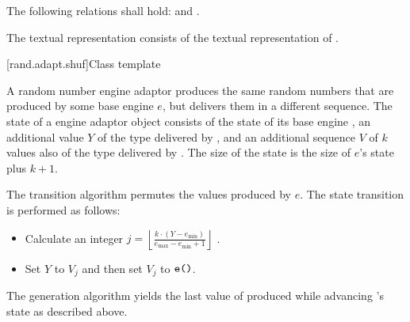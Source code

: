 \pnum
The following relations shall hold:
and
  .

\pnum
The textual representation
consists of the textual representation of .



[rand.adapt.shuf]{Class template }%
%

\pnum
A  random number engine adaptor
produces the same random numbers
that are produced by some base engine $e$,
but delivers them in a different sequence.
The state 
of a  engine adaptor object 
consists of
 the state  of its base engine ,
 an additional value $Y$ of the type delivered by ,
and
 an additional sequence $V$ of $k$ values
 also of the type delivered by .
The size of the state is
 the size of $e$'s state plus $k + 1$.

\pnum
The transition algorithm
permutes the values produced by $e$.
The state transition is performed as follows:
\begin{itemize}
 \item
   Calculate an integer
   $j = \left\lfloor \frac{k \cdot (Y - e_{\min})}
                          {e_{\max} - e_{\min} +1}
        \right\rfloor
   $%
   .
 \item
   Set $Y$ to $V_j$ and then set $V_j$ to $\tcode{e()}$.
\end{itemize}

\pnum
The generation algorithm
yields the last value of 
 produced while advancing 's state as described above.

